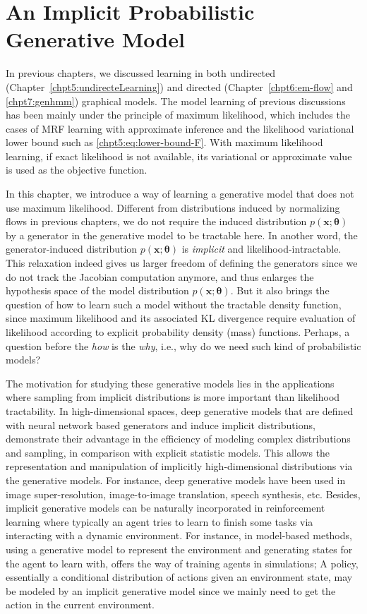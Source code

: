 \chapter{An Implicit Probabilistic Generative Model}
\label{chapter8}
\graphicspath{{source/chapter8/}}
In previous chapters, we discussed learning in both undirected (Chapter~\ref{chpt5:undirecteLearning}) and directed (Chapter~\ref{chpt6:em-flow} and \ref{chpt7:genhmm}) graphical models. The model learning of previous discussions has been mainly under the principle of maximum likelihood, which includes the cases of MRF learning with approximate inference and the likelihood variational lower bound such as \eqref{chpt5:eq:lower-bound-F}. With maximum likelihood learning, if exact likelihood is not available, its variational or approximate value is used as the objective function.

In this chapter, we introduce a way of learning a generative model that does not use maximum likelihood. Different from distributions induced by normalizing flows in previous chapters, we do not require the induced distribution $p(\bm{x};\bm{\theta})$ by a generator in the generative model to be tractable here. In another word, the generator-induced distribution $p(\bm{x};\bm{\theta})$ is \textit{implicit} and likelihood-intractable. This relaxation indeed gives us larger freedom of defining the generators since we do not track the Jacobian computation anymore, and thus enlarges the hypothesis space of the model distribution $p(\bm{x};\bm{\theta})$. But it also brings the question of how to learn such a model without the tractable density function, since maximum likelihood and its associated KL divergence require evaluation of likelihood according to explicit probability density (mass) functions.  Perhaps, a question before the \textit{how} is the \textit{why}, i.e., why do we need such kind of probabilistic models?

The motivation for studying these generative models lies in the applications where sampling from implicit distributions is more important than likelihood tractability. In high-dimensional spaces, deep generative models that are defined with neural network based generators and induce implicit distributions, demonstrate their advantage in the efficiency of modeling complex distributions and sampling, in comparison with explicit statistic models. This allows the representation and manipulation of implicitly high-dimensional distributions via the generative models. For instance, deep generative models have been used in image super-resolution, image-to-image translation, speech synthesis, etc. Besides, implicit generative models can be naturally incorporated in reinforcement learning where typically an agent tries to learn to finish some tasks via interacting with a dynamic environment. For instance, in model-based methods, using a generative model to represent the environment and generating states for the agent to learn with, offers the way of training agents in simulations; A policy, essentially a conditional distribution of actions given an environment state, may be modeled by an implicit generative model since we mainly need to get the action in the current environment.

